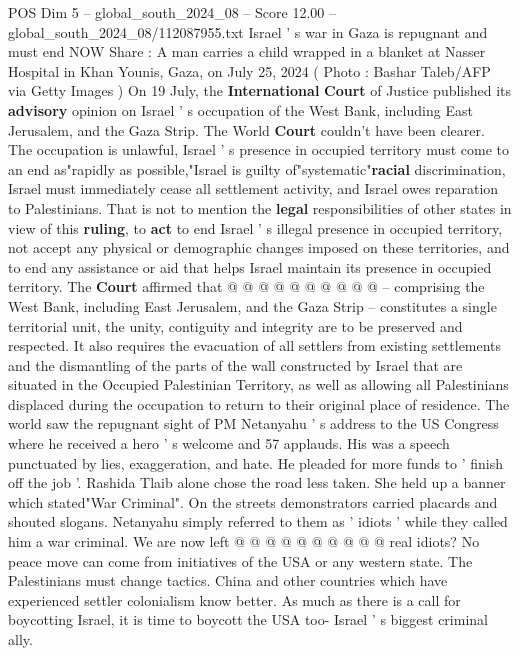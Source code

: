 \begin{textsample}{POS Dim 5 – global\_south\_2024\_08 – Score 12.00 – global\_south\_2024\_08/112087955.txt}  \label{ex:f5_pos_286}
Israel ' s war in Gaza is repugnant and must end NOW Share : A man carries a child wrapped in a blanket at Nasser Hospital in Khan Younis, Gaza, on July 25, 2024 ( Photo : Bashar Taleb/AFP via Getty Images ) On 19 July, the \textbf{International} \textbf{Court} of Justice published its \textbf{advisory} opinion on Israel ' s occupation of the West Bank, including East Jerusalem, and the Gaza Strip.
The World \textbf{Court} couldn't have been clearer.
The occupation is unlawful, Israel ' s presence in occupied territory must come to an end as"rapidly as possible,"Israel is guilty of"systematic"\textbf{racial} discrimination, Israel must immediately cease all settlement activity, and Israel owes reparation to Palestinians.
That is not to mention the \textbf{legal} responsibilities of other states in view of this \textbf{ruling}, to \textbf{act} to end Israel ' s illegal presence in occupied territory, not accept any physical or demographic changes imposed on these territories, and to end any assistance or aid that helps Israel maintain its presence in occupied territory.
The \textbf{Court} affirmed that @ @ @ @ @ @ @ @ @ @ -- comprising the West Bank, including East Jerusalem, and the Gaza Strip -- constitutes a single territorial unit, the unity, contiguity and integrity are to be preserved and respected.
It also requires the evacuation of all settlers from existing settlements and the dismantling of the parts of the wall constructed by Israel that are situated in the Occupied Palestinian Territory, as well as allowing all Palestinians displaced during the occupation to return to their original place of residence.
The world saw the repugnant sight of PM Netanyahu ' s address to the US Congress where he received a hero ' s welcome and 57 applauds.
His was a speech punctuated by lies, exaggeration, and hate.
He pleaded for more funds to ' finish off the job '.
Rashida Tlaib alone chose the road less taken.
She held up a banner which stated"War Criminal".
On the streets demonstrators carried placards and shouted slogans.
Netanyahu simply referred to them as ' idiots ' while they called him a war criminal.
We are now left @ @ @ @ @ @ @ @ @ @ real idiots?
No peace move can come from initiatives of the USA or any western state.
The Palestinians must change tactics.
China and other countries which have experienced settler colonialism know better.
As much as there is a call for boycotting Israel, it is time to boycott the USA too- Israel ' s biggest criminal ally.

\end{textsample}
